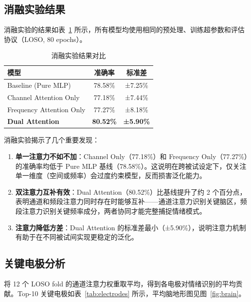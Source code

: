 \documentclass[12pt,a4paper]{ctexart}
\begin{document}
\subsection{消融实验结果}

消融实验的结果如表~\ref{tab:ablation} 所示，所有模型均使用相同的预处理、训练超参数和评估协议（LOSO, 80 epochs）。

\begin{table}[H]
\centering
\caption{消融实验结果对比}
\label{tab:ablation}
\begin{tabular}{lcc}
\toprule
\textbf{模型} & \textbf{准确率} & \textbf{标准差} \\
\midrule
Baseline (Pure MLP)     & 78.58\% & ±7.25\% \\
Channel Attention Only  & 77.18\% & ±7.44\% \\
Frequency Attention Only& 77.27\% & ±8.18\% \\
\textbf{Dual Attention} & \textbf{80.52\%} & \textbf{±5.90\%} \\
\bottomrule
\end{tabular}
\end{table}

消融实验揭示了几个重要发现：
\begin{enumerate}[itemsep=0pt]
    \item \textbf{单一注意力不如不加}：Channel Only（77.18\%）和 Frequency Only（77.27\%）的准确率均低于 Pure MLP 基线（78.58\%）。这说明在跨被试设定下，仅关注单一维度（空间或频率）会过度约束模型，反而损害泛化能力。
    \item \textbf{双注意力互补有效}：Dual Attention（80.52\%）比基线提升了约 2 个百分点，表明通道和频段注意力同时存在时能够互补——通道注意力识别关键脑区，频段注意力识别关键频率成分，两者协同才能完整捕捉情绪模式。
    \item \textbf{注意力降低方差}：Dual Attention 的标准差最小（±5.90\%），说明注意力机制有助于在不同被试间实现更稳定的泛化。
\end{enumerate}

\subsection{关键电极分析}

将 12 个 LOSO fold 的通道注意力权重取平均，得到各电极对情绪识别的平均贡献。Top-10 关键电极如表~\ref{tab:electrodes} 所示，平均脑地形图见图~\ref{fig:brain}。
\end{document}
